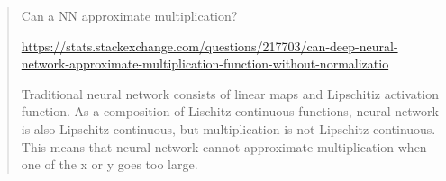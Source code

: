 \begin{quotation}
  Can a NN approximate multiplication?

  \url{https://stats.stackexchange.com/questions/217703/can-deep-neural-network-approximate-multiplication-function-without-normalizatio}

  Traditional neural network consists of linear maps and Lipschitiz activation function. As a composition of Lischitz continuous functions, neural network is also Lipschitz continuous, but multiplication is not Lipschitz continuous. This means that neural network cannot approximate multiplication when one of the x or y goes too large.
\end{quotation}
